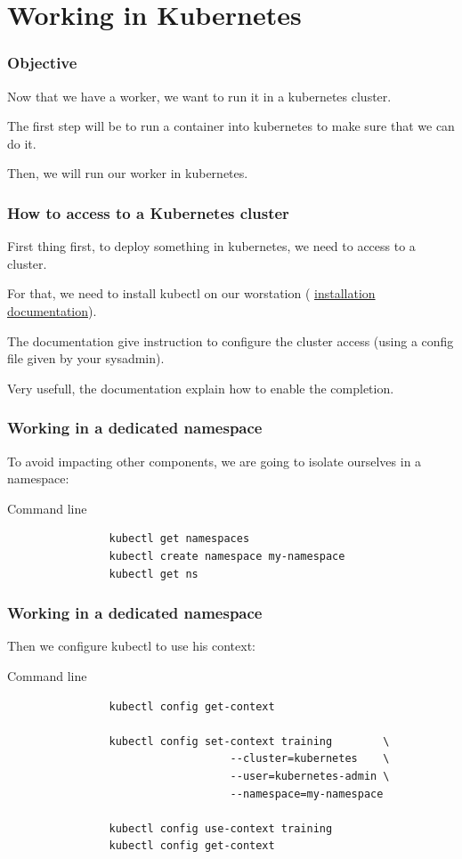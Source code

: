\section{Working in Kubernetes}

	\begin{frame}
		\frametitle{Objective}
		Now that we have a worker, we want to run it in a kubernetes cluster.
		
		\bigskip
		The first step will be to run a container into kubernetes to make sure that we can do it.
		
		Then, we will run our worker in kubernetes.	
	\end{frame}
	
	\begin{frame}
		\frametitle{How to access to a Kubernetes cluster}
		
		First thing first, to deploy something in kubernetes, we need to access to a cluster.
		
		\bigskip
		For that, we need to install kubectl on our worstation ( \href{https://kubernetes.io/docs/tasks/tools/install-kubectl/}{installation documentation}).
		 
		 \bigskip
		The documentation give instruction to configure the cluster access (using a config file given by your sysadmin).

		\bigskip		
		Very usefull, the documentation explain how to enable the completion.
	\end{frame}
	
	\begin{frame}[fragile]
		\frametitle{Working in a dedicated namespace}
		
		To avoid impacting other components, we are going to isolate ourselves in a namespace:
		\begin{block}{Command line}
			\begin{verbatim}
				kubectl get namespaces
				kubectl create namespace my-namespace
				kubectl get ns
			\end{verbatim}
		\end{block}
	\end{frame}
		
	\begin{frame}[fragile]
		\frametitle{Working in a dedicated namespace}
	
		Then we configure kubectl to use his context:
		\begin{block}{Command line}
			\begin{verbatim}
				kubectl config get-context
				
				kubectl config set-context training        \
				                   --cluster=kubernetes    \
				                   --user=kubernetes-admin \
				                   --namespace=my-namespace
							
				kubectl config use-context training
				kubectl config get-context
			\end{verbatim}
		\end{block}
	\end{frame}
	
